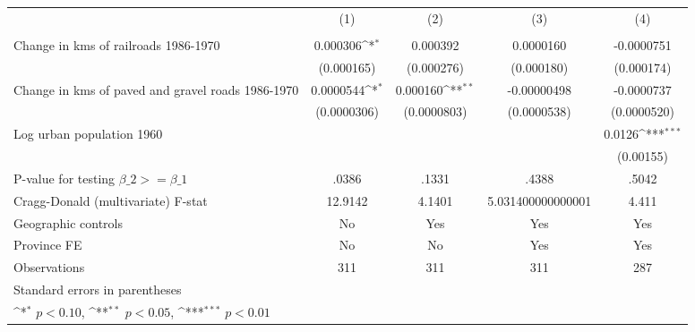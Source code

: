 {
\def\sym#1{\ifmmode^{#1}\else\(^{#1}\)\fi}
\begin{tabular}{l*{4}{c}}
\hline\hline
                &\multicolumn{1}{c}{(1)}&\multicolumn{1}{c}{(2)}&\multicolumn{1}{c}{(3)}&\multicolumn{1}{c}{(4)}\\
                &\multicolumn{1}{c}{}&\multicolumn{1}{c}{}&\multicolumn{1}{c}{}&\multicolumn{1}{c}{}\\
\hline
Change in kms of railroads 1986-1970& 0.000306\sym{*}  & 0.000392         &0.0000160         &-0.0000751         \\
                &(0.000165)         &(0.000276)         &(0.000180)         &(0.000174)         \\
[1em]
Change in kms of paved and gravel roads 1986-1970&0.0000544\sym{*}  & 0.000160\sym{**} &-0.00000498         &-0.0000737         \\
                &(0.0000306)         &(0.0000803)         &(0.0000538)         &(0.0000520)         \\
[1em]
Log urban population 1960&                  &                  &                  &   0.0126\sym{***}\\
                &                  &                  &                  &(0.00155)         \\
\hline
P-value for testing $\beta\_{2} >= \beta\_{1}$&    .0386         &    .1331         &    .4388         &    .5042         \\
Cragg-Donald (multivariate) F-stat&  12.9142         &   4.1401         &5.031400000000001         &    4.411         \\
Geographic controls&       No         &      Yes         &      Yes         &      Yes         \\
Province FE     &       No         &       No         &      Yes         &      Yes         \\
Observations    &      311         &      311         &      311         &      287         \\
\hline\hline
\multicolumn{5}{l}{\footnotesize Standard errors in parentheses}\\
\multicolumn{5}{l}{\footnotesize \sym{*} \(p<0.10\), \sym{**} \(p<0.05\), \sym{***} \(p<0.01\)}\\
\end{tabular}
}
